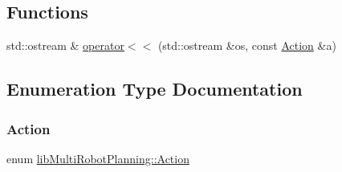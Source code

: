\subsection*{Functions}
\begin{DoxyCompactItemize}
\item 
std\+::ostream \& \hyperlink{namespacelib_multi_robot_planning_ac64bacf3115f1341bd7ce739c119f00a}{operator$<$$<$} (std\+::ostream \&os, const \hyperlink{namespacelib_multi_robot_planning_aba73fb71693f86a324adfa0e41e1053d}{Action} \&a)
\end{DoxyCompactItemize}


\subsection{Enumeration Type Documentation}
\mbox{\label{namespacelib_multi_robot_planning_aba73fb71693f86a324adfa0e41e1053d}} 
\subsubsection{\texorpdfstring{Action}{Action}}
{\footnotesize\ttfamily enum \hyperlink{namespacelib_multi_robot_planning_aba73fb71693f86a324adfa0e41e1053d}{lib\+Multi\+Robot\+Planning\+::\+Action}\hspace{0.3cm}{\ttfamily [strong]}}

